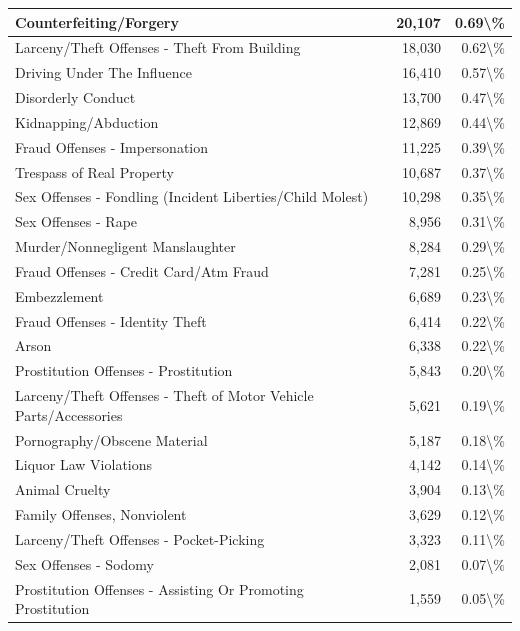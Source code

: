 \documentclass[
]{krantz}
\begin{document}
\begin{longtable}[t]{l|r|r}
\hline
Counterfeiting/Forgery & 20,107 & 0.69\textbackslash{}\%\\
\hline
Larceny/Theft Offenses - Theft From Building & 18,030 & 0.62\textbackslash{}\%\\
\hline
Driving Under The Influence & 16,410 & 0.57\textbackslash{}\%\\
\hline
Disorderly Conduct & 13,700 & 0.47\textbackslash{}\%\\
\hline
Kidnapping/Abduction & 12,869 & 0.44\textbackslash{}\%\\
\hline
Fraud Offenses - Impersonation & 11,225 & 0.39\textbackslash{}\%\\
\hline
Trespass of Real Property & 10,687 & 0.37\textbackslash{}\%\\
\hline
Sex Offenses - Fondling (Incident Liberties/Child Molest) & 10,298 & 0.35\textbackslash{}\%\\
\hline
Sex Offenses - Rape & 8,956 & 0.31\textbackslash{}\%\\
\hline
Murder/Nonnegligent Manslaughter & 8,284 & 0.29\textbackslash{}\%\\
\hline
Fraud Offenses - Credit Card/Atm Fraud & 7,281 & 0.25\textbackslash{}\%\\
\hline
Embezzlement & 6,689 & 0.23\textbackslash{}\%\\
\hline
Fraud Offenses - Identity Theft & 6,414 & 0.22\textbackslash{}\%\\
\hline
Arson & 6,338 & 0.22\textbackslash{}\%\\
\hline
Prostitution Offenses - Prostitution & 5,843 & 0.20\textbackslash{}\%\\
\hline
Larceny/Theft Offenses - Theft of Motor Vehicle Parts/Accessories & 5,621 & 0.19\textbackslash{}\%\\
\hline
Pornography/Obscene Material & 5,187 & 0.18\textbackslash{}\%\\
\hline
Liquor Law Violations & 4,142 & 0.14\textbackslash{}\%\\
\hline
Animal Cruelty & 3,904 & 0.13\textbackslash{}\%\\
\hline
Family Offenses, Nonviolent & 3,629 & 0.12\textbackslash{}\%\\
\hline
Larceny/Theft Offenses - Pocket-Picking & 3,323 & 0.11\textbackslash{}\%\\
\hline
Sex Offenses - Sodomy & 2,081 & 0.07\textbackslash{}\%\\
\hline
Prostitution Offenses - Assisting Or Promoting Prostitution & 1,559 & 0.05\textbackslash{}\%\\

\end{longtable}
\end{document}
